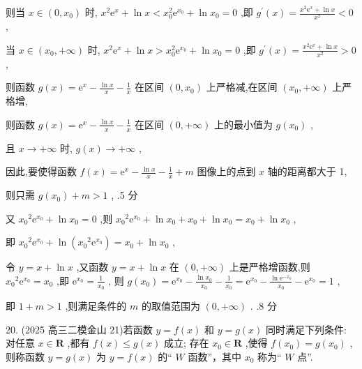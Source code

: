 \documentclass[10pt]{article}
\newcommand*\circled[1]{\tikz[baseline=(char.base)]{\node[shape=circle,draw,inner sep=1.5pt] (char) {\small #1};}}
\begin{document}
则当 \(x \in  \left( {0,{x}_{0}}\right)\) 时, \({x}^{2}{\mathrm{e}}^{x} + \ln x < {x}_{0}^{2}{\mathrm{e}}^{{x}_{0}} + \ln {x}_{0} = 0\) ,即 \({g}^{\prime }\left( x\right)  = \frac{{x}^{2}{\mathrm{e}}^{x} + \ln x}{{x}^{2}} < 0\) ,

当 \(x \in  \left( {{x}_{0}, + \infty }\right)\) 时, \({x}^{2}{\mathrm{e}}^{x} + \ln x > {x}_{0}^{2}{\mathrm{e}}^{{x}_{0}} + \ln {x}_{0} = 0\) ,即 \({g}^{\prime }\left( x\right)  = \frac{{x}^{2}{\mathrm{e}}^{x} + \ln x}{{x}^{2}} > 0\) ,

则函数 \(g\left( x\right)  = {\mathrm{e}}^{x} - \frac{\ln x}{x} - \frac{1}{x}\) 在区间 \(\left( {0,{x}_{0}}\right)\) 上严格减,在区间 \(\left( {{x}_{0}, + \infty }\right)\) 上严格增,

则函数 \(g\left( x\right)  = {\mathrm{e}}^{x} - \frac{\ln x}{x} - \frac{1}{x}\) 在区间 \(\left( {0, + \infty }\right)\) 上的最小值为 \(g\left( {x}_{0}\right)\) ,

且 \(x \rightarrow   + \infty\) 时, \(g\left( x\right)  \rightarrow   + \infty\) ,

因此,要使得函数 \(f\left( x\right)  = {\mathrm{e}}^{x} - \frac{\ln x}{x} - \frac{1}{x} + m\) 图像上的点到 \(x\) 轴的距离都大于 1,

则只需 \(g\left( {x}_{0}\right)  + m > 1\) , .5 分

又 \({x}_{0}{}^{2}{\mathrm{e}}^{{x}_{0}} + \ln {x}_{0} = 0\) ,则 \({x}_{0}{}^{2}{\mathrm{e}}^{{x}_{0}} + \ln {x}_{0} + {x}_{0} + \ln {x}_{0} = {x}_{0} + \ln {x}_{0}\) ,

即 \({x}_{0}{}^{2}{\mathrm{e}}^{{x}_{0}} + \ln \left( {{x}_{0}{}^{2}{\mathrm{e}}^{{x}_{0}}}\right)  = {x}_{0} + \ln {x}_{0}\) ,

令 \(y = x + \ln x\) ,又函数 \(y = x + \ln x\) 在 \(\left( {0, + \infty }\right)\) 上是严格增函数,则 \({x}_{0}{}^{2}{\mathrm{e}}^{{x}_{0}} = {x}_{0}\) ,即 \({\mathrm{e}}^{{x}_{0}} = \frac{1}{{x}_{0}}\) , 则 \(g\left( {x}_{0}\right)  = {\mathrm{e}}^{{x}_{0}} - \frac{\ln {x}_{0}}{{x}_{0}} - \frac{1}{{x}_{0}} = {\mathrm{e}}^{{x}_{0}} - \frac{\ln {\mathrm{e}}^{-{x}_{0}}}{{x}_{0}} - {\mathrm{e}}^{{x}_{0}} = 1\) ,

即 \(1 + m > 1\) ,则满足条件的 \(m\) 的取值范围为 \(\left( {0, + \infty }\right)\) . .8 分

20. (2025 高三二模金山 21)若函数 \(y = f\left( x\right)\) 和 \(y = g\left( x\right)\) 同时满足下列条件: \circled{1} 对任意 \(x \in  \mathbf{R}\) ,都有 \(f\left( x\right)  \leq  g\left( x\right)\) 成立;  \circled{2} 存在 \({x}_{0} \in  \mathbf{R}\) ,使得 \(f\left( {x}_{0}\right)  = g\left( {x}_{0}\right)\) ,则称函数 \(y = g\left( x\right)\) 为 \(y = f\left( x\right)\) 的“ \(W\) 函数”，其中 \({x}_{0}\) 称为“ \(W\) 点”.
\end{document}
